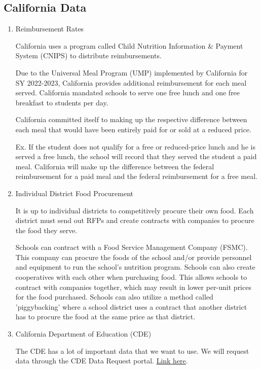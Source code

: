 \documentclass[12pt]{article}
\begin{document}
\subsection{California Data}

\begin{enumerate}
	
	\item Reimbursement Rates 
	
	California uses a program called Child Nutrition Information \& Payment System (CNIPS) to distribute reimbursements. 
	
	Due to the Universal Meal Program (UMP) implemented by California for SY 2022-2023, California provides additional reimbursement for each meal served. California mandated schools to serve one free lunch and one free breakfast to students per day. 
	
	California committed itself to making up the respective difference between each meal that would have been entirely paid for or sold at a reduced price.
	
	Ex. If the student does not qualify for a free or reduced-price lunch and he is served a free lunch, the school will record that they served the student a paid meal. California will make up the difference between the federal reimbursement for a paid meal and the federal reimbursement for a free meal.
	
	\item Individual District Food Procurement
	
	It is up to individual districts to competitively procure their own food. Each district must send out RFPs and create contracts with companies to procure the food they serve.
	
	Schools can contract with a Food Service Management Company (FSMC). This company can procure the foods of the school and/or provide personnel and equipment to run the school's nutrition program. Schools can also create cooperatives with each other when purchasing food. This allows schools to contract with companies together, which may result in lower per-unit prices for the food purchased. Schools can also utilize a method called 'piggybacking' where a school district uses a contract that another district has to procure the food at the same price as that district.  
	
	\item California Department of Education (CDE)
	
	The CDE has a lot of important data that we want to use. We will request data through the CDE Data Request portal. \href{https://www.cde.ca.gov/ds/da/}{Link here}.
	

\end{enumerate}
\end{document}
